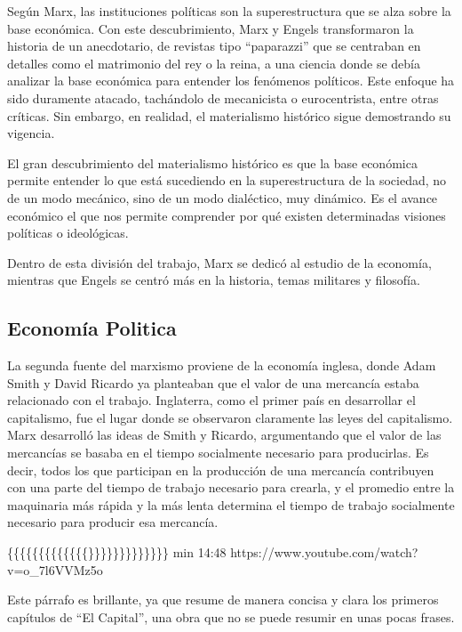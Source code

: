 \documentclass[
  a4paper,
]{article}
\begin{document}
Según Marx, las instituciones políticas son la superestructura que se
alza sobre la base económica. Con este descubrimiento, Marx y Engels
transformaron la historia de un anecdotario, de revistas tipo
``paparazzi'' que se centraban en detalles como el matrimonio del rey o
la reina, a una ciencia donde se debía analizar la base económica para
entender los fenómenos políticos. Este enfoque ha sido duramente
atacado, tachándolo de mecanicista o eurocentrista, entre otras
críticas. Sin embargo, en realidad, el materialismo histórico sigue
demostrando su vigencia.

El gran descubrimiento del materialismo histórico es que la base
económica permite entender lo que está sucediendo en la superestructura
de la sociedad, no de un modo mecánico, sino de un modo dialéctico, muy
dinámico. Es el avance económico el que nos permite comprender por qué
existen determinadas visiones políticas o ideológicas.

Dentro de esta división del trabajo, Marx se dedicó al estudio de la
economía, mientras que Engels se centró más en la historia, temas
militares y filosofía.

\hypertarget{economuxeda-politica}{%
\subsection{Economía Politica}\label{economuxeda-politica}}

La segunda fuente del marxismo proviene de la economía inglesa, donde
Adam Smith y David Ricardo ya planteaban que el valor de una mercancía
estaba relacionado con el trabajo. Inglaterra, como el primer país en
desarrollar el capitalismo, fue el lugar donde se observaron claramente
las leyes del capitalismo. Marx desarrolló las ideas de Smith y Ricardo,
argumentando que el valor de las mercancías se basaba en el tiempo
socialmente necesario para producirlas. Es decir, todos los que
participan en la producción de una mercancía contribuyen con una parte
del tiempo de trabajo necesario para crearla, y el promedio entre la
maquinaria más rápida y la más lenta determina el tiempo de trabajo
socialmente necesario para producir esa mercancía.

\{\{\{\{\{\{\{\{\{\{\{\{\{\}\}\}\}\}\}\}\}\}\}\}\}\} min 14:48
https://www.youtube.com/watch?v=o\_7l6VVMz5o

Este párrafo es brillante, ya que resume de manera concisa y clara los
primeros capítulos de ``El Capital'', una obra que no se puede resumir
en unas pocas frases.
\end{document}
